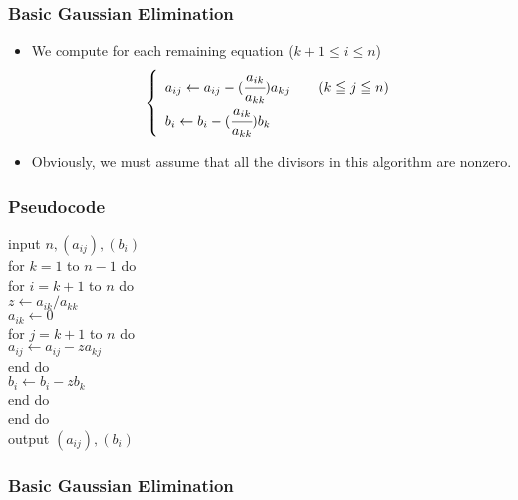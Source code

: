 \documentclass[notheorems,mathserif,table,compress]{beamer}  %
\begin{document}
\begin{frame}
\frametitle{Basic Gaussian Elimination}
\begin{itemize}
\item We compute for each remaining equation ($k+1\leq i\leq n$)
\begin{eqnarray*}
\left \{\begin{array}{ll}
a_{ij}\leftarrow a_{ij}-(\cfrac{a_{ik}}{a_{kk}})a_{kj} \qquad (k\leqq j\leqq n)\\
b_{i}\leftarrow b_{i}-(\cfrac{a_{ik}}{a_{kk}})b_{k} 
\end{array} \right.
\end{eqnarray*}

\end{itemize}
\begin{itemize}
\item Obviously, we must assume that all the divisors in this algorithm are nonzero.
\end{itemize}

\end{frame}

\begin{frame}
\frametitle{Pseudocode}
\textsf{input} $n,(a_{ij}),(b_i)$\\
\textsf{for} $k=1$ \textsf{to} $n−1$ \textsf{do}\\
   \textsf{for} $i=k+1$ \textsf{to} $n$ \textsf{do}\\
        $z\leftarrow a_{ik}/a_{kk}$\\
        $a_{ik}\leftarrow 0$\\
        \textsf{for} $j=k+1$ \textsf{to} $n$ \textsf{do}\\
             $a_{ij}\leftarrow a_{ij}−za_{kj}$\\
        \textsf{end do}\\
        $b_i\leftarrow b_i−zb_k$\\
   \textsf{end do}\\
\textsf{end do}\\
\textsf{output} $(a_{ij}),(b_i)$
\end{frame}

\begin{frame}
\frametitle{Basic Gaussian Elimination}

\end{frame}

\begin{frame}

\end{frame}
\end{document}
